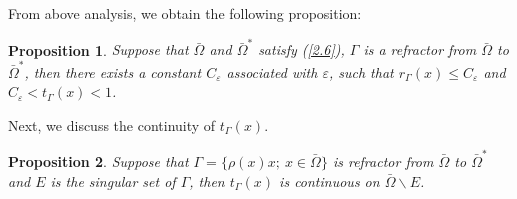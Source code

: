 \documentclass[a4paper,12pt,]{article}
\newtheorem{proposition}{\bf Proposition}[section]%
\numberwithin{equation}{section}
\numberwithin{equation}{section} \allowdisplaybreaks
\begin{document}
From above analysis, we obtain the following proposition:
\begin{proposition}
  Suppose that $\bar{\Omega}$ and $\bar{\Omega}^{\ast}$ satisfy (\ref{2.6}), $\Gamma$ is a refractor from $\bar{\Omega}$ to $\bar{\Omega}^{\ast}$, then there exists a constant $C_{\varepsilon}$ associated with $\varepsilon$, such that $r_{\Gamma}(x) \leq C_{\varepsilon}$ and $C_{\varepsilon} < t_{\Gamma}(x) <1$.
  \label{prop3.1}
\end{proposition}

Next, we discuss the continuity of $t_{\Gamma}(x)$.
\begin{proposition}
  Suppose that $\Gamma = \{\rho(x)x;~x\in \bar{\Omega}\}$ is refractor from $\bar{\Omega}$ to $\bar{\Omega}^{\ast}$ and $E$ is the singular set of $\Gamma$, then $t_{\Gamma}(x)$ is continuous on $\bar{\Omega}\backslash E$.
  \label{prop3.2}
\end{proposition}
\end{document}
